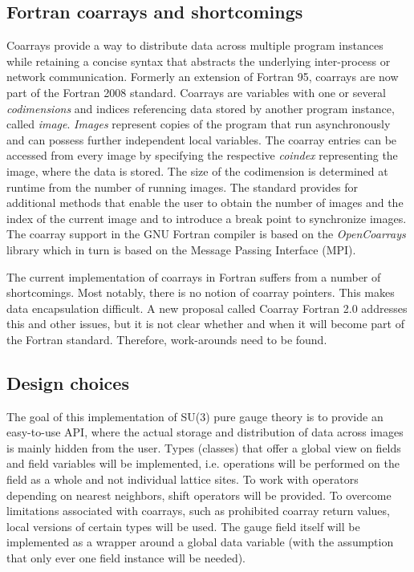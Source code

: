\documentclass[graybox]{svmult}
\begin{document}
\subsection{Fortran coarrays and shortcomings}
Coarrays provide a way to distribute data across multiple program instances while retaining a concise syntax that abstracts the underlying inter-process or network communication. Formerly an extension of Fortran 95, coarrays are now part of the Fortran 2008 standard. Coarrays are variables with one or several \emph{codimensions} and indices referencing data stored by another program instance, called \emph{image}. \emph{Images} represent copies of the program that run asynchronously and can possess further independent local variables. The coarray entries can be accessed from every image by specifying the respective \emph{coindex} representing the image, where the data is stored. The size of the codimension is determined at runtime from the number of running images. The standard provides for additional methods that enable the user to obtain the number of images and the index of the current image and to introduce a break point to synchronize images. The coarray support in the GNU Fortran compiler is based on the \emph{OpenCoarrays} \cite{opencoarrays} library which in turn is based on the Message Passing Interface (MPI).

The current implementation of coarrays in Fortran suffers from a number of shortcomings. Most notably, there is no notion of coarray pointers. This makes data encapsulation difficult. A new proposal called Coarray Fortran 2.0 \cite{coarr2.0} addresses this and other issues, but it is not clear whether and when it will become part of the Fortran standard. Therefore, work-arounds need to be found.

\subsection{Design choices}
The goal of this implementation of SU(3) pure gauge theory is to provide an easy-to-use API, where the actual storage and distribution of data across images is mainly hidden from the user. Types (classes) that offer a global view on fields and field variables will be implemented, i.e. operations will be performed on the field as a whole and not individual lattice sites. To work with operators depending on nearest neighbors, shift operators will be provided. To overcome limitations associated with coarrays, such as prohibited coarray return values, local versions of certain types will be used. The gauge field itself will be implemented as a wrapper around a global data variable (with the assumption that only ever one field instance will be needed).
\end{document}
